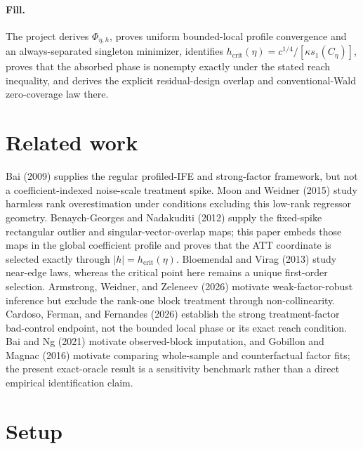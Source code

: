 \documentclass{article}
\begin{document}
\paragraph{Fill.} The project derives \(\Phi_{\eta,h}\), proves uniform bounded-local profile convergence and an always-separated singleton minimizer, identifies \(h_{\mathrm{crit}}(\eta)=c^{1/4}/[\kappa s_1(C_\eta)]\), proves that the absorbed phase is nonempty exactly under the stated reach inequality, and derives the explicit residual-design overlap and conventional-Wald zero-coverage law there.

\section{Related work}

Bai (2009) supplies the regular profiled-IFE and strong-factor framework, but not a coefficient-indexed noise-scale treatment spike.  Moon and Weidner (2015) study harmless rank overestimation under conditions excluding this low-rank regressor geometry.  Benaych-Georges and Nadakuditi (2012) supply the fixed-spike rectangular outlier and singular-vector-overlap maps; this paper embeds those maps in the global coefficient profile and proves that the ATT coordinate is selected exactly through \(|h|=h_{\mathrm{crit}}(\eta)\).  Bloemendal and Virag (2013) study near-edge laws, whereas the critical point here remains a unique first-order selection.  Armstrong, Weidner, and Zeleneev (2026) motivate weak-factor-robust inference but exclude the rank-one block treatment through non-collinearity.  Cardoso, Ferman, and Fernandes (2026) establish the strong treatment-factor bad-control endpoint, not the bounded local phase or its exact reach condition.  Bai and Ng (2021) motivate observed-block imputation, and Gobillon and Magnac (2016) motivate comparing whole-sample and counterfactual factor fits; the present exact-oracle result is a sensitivity benchmark rather than a direct empirical identification claim.

\section{Setup}
\end{document}
